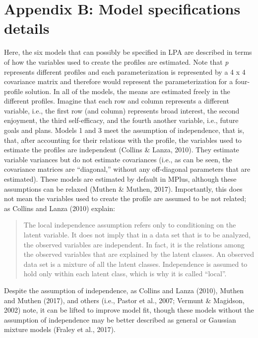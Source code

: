 \documentclass[]{msu-thesis}
\theoremstyle{definition}
\theoremstyle{definition}
\theoremstyle{definition}
\theoremstyle{remark}
\begin{document}
\section{Appendix B: Model specifications
details}\label{appendix-b-model-specifications-details}

Here, the six models that can possibly be specified in LPA are described
in terms of how the variables used to create the profiles are estimated.
Note that \emph{p} represents different profiles and each
parameterization is represented by a 4 x 4 covariance matrix and
therefore would represent the parameterization for a four-profile
solution. In all of the models, the means are estimated freely in the
different profiles. Imagine that each row and column represents a
different variable, i.e., the first row (and column) represents broad
interest, the second enjoyment, the third self-efficacy, and the fourth
another variable, i.e., future goals and plans. Models 1 and 3 meet the
assumption of independence, that is, that, after accounting for their
relations with the profile, the variables used to estimate the profiles
are independent (Collins \& Lanza, 2010). They estimate variable
variances but do not estimate covariances (i.e., as can be seen, the
covariance matrices are ``diagonal,'' without any off-diagonal
parameters that are estimated). These models are estimated by default in
MPlus, although these assumptions can be relaxed (Muthen \& Muthen,
2017). Importantly, this does not mean the variables used to create the
profile are assumed to be not related; as Collins and Lanza (2010)
explain:

\begin{quote}
The local independence assumption refers only to conditioning on the
latent variable. It does not imply that in a data set that is to be
analyzed, the observed variables are independent. In fact, it is the
relations among the observed variables that are explained by the latent
classes. An observed data set is a mixture of all the latent classes.
Independence is assumed to hold only within each latent class, which is
why it is called ``local''.
\end{quote}

Despite the assumption of independence, as Collins and Lanza (2010),
Muthen and Muthen (2017), and others (i.e., Pastor et al., 2007; Vermunt
\& Magidson, 2002) note, it can be lifted to improve model fit, though
these models without the assumption of independence may be better
described as general or Gaussian mixture models (Fraley et al., 2017).
\end{document}
